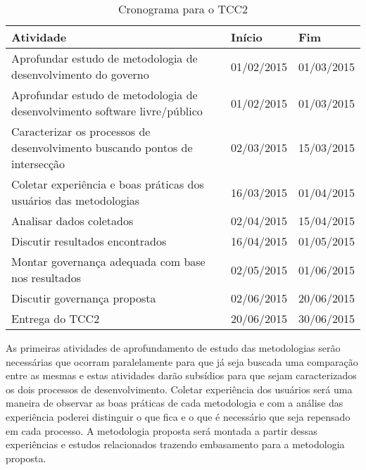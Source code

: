 \newpage

\begin{table}[htb]
\center
\footnotesize
\begin{tabular}{|p{8cm}|p{3cm}|p{3cm}|}
  \hline
   \textbf{Atividade} & \textbf{Início} & \textbf{Fim}\\
    \hline
	Aprofundar estudo de metodologia de desenvolvimento do governo & 01/02/2015 & 01/03/2015\\
    \hline
	Aprofundar estudo de metodologia de desenvolvimento software livre/público & 01/02/2015 & 01/03/2015\\
    \hline
        Caracterizar os processos de desenvolvimento buscando pontos de intersecção & 02/03/2015 & 15/03/2015\\
    \hline
	Coletar experiência e boas práticas dos usuários das metodologias & 16/03/2015 & 01/04/2015\\
    \hline
	Analisar dados coletados & 02/04/2015 & 15/04/2015\\
    \hline 
	Discutir resultados encontrados & 16/04/2015 & 01/05/2015\\
    \hline
	Montar governança adequada com base nos resultados & 02/05/2015 & 01/06/2015\\
    \hline
	Discutir governança proposta & 02/06/2015 & 20/06/2015\\
    \hline
	Entrega do TCC2 & 20/06/2015 & 30/06/2015\\
    \hline
\end{tabular}
\caption{Cronograma para o TCC2}
\label{cronograma}
\end{table}

As primeiras atividades de aprofundamento de estudo das metodologias serão 
necessárias que ocorram paralelamente para que já seja buscada uma comparação 
entre as mesmas e estas atividades darão subsídios para que sejam caracterizados 
os dois processos de desenvolvimento.
%
Coletar experiência dos usuários será uma maneira de observar as boas práticas de cada 
metodologia e com a análise das experiência poderei distinguir o que fica e o que 
é necessário que seja repensado em cada processo.
%
A metodologia proposta será montada a partir dessas experiências e estudos relacionados
trazendo embasamento para a metodologia proposta. 
